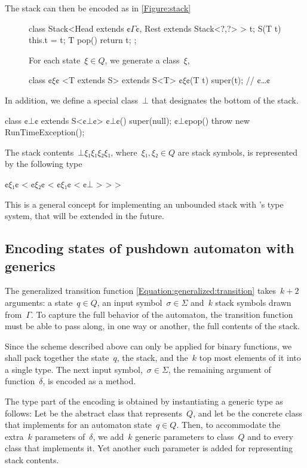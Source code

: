 The stack can then be encoded as in \cref{Figure:stack}
\begin{figure}
\begin{JAVA}
class Stack<Head extends ¢$Γ$¢, Rest extends Stack<?,?> > {
   t;
  S(T t) { this.t = t; }
  T pop() { return t; };
}
\end{JAVA}
For each state~$ξ∈Q$, we generate a \Java class~$ξ$,
\begin{JAVA}
class ¢$ξ$¢ <T extends S> extends S<T> {
  ¢$ξ$¢(T t) { super(t); }
  // ¢…¢
}
\end{JAVA}
\end{figure}
In addition, we define a special class~$⊥$ that designates the bottom of the stack.
\begin{JAVA}
class ¢$⊥$¢ extends S<¢$⊥$¢> {
  ¢$⊥$¢() { super(null); }
  ¢$⊥$¢pop() { throw new RunTimeException(); }
}
\end{JAVA}
The stack contents~$⊥ξ₁ξ₁ξ₂ξ₁$,
where~$ξ₁,ξ₂∈Q$ are stack symbols,
is represented by the following type
\begin{JAVA}
  ¢$ξ₁$¢ < ¢$ξ₂$¢ < ¢$ξ₁$¢ < ¢$⊥$ > > >
\end{JAVA}
This is a general concept for implementing an unbounded stack with \Java's type system,
that will be extended in the future.

\subsection{Encoding states of pushdown automaton with \Java generics}
The generalized transition function \cref{Equation:generalized:transition}
  takes~$k+2$ arguments: a state~$q∈Q$, an input symbol~$σ∈Σ$
    and~$k$ stack symbols drawn from~$Γ$.
To capture the full behavior of the automaton, the transition function
  must be able to pass along, in one way or another, the full contents of the stack.

Since the scheme described above can only be applied for binary functions,
  we shall pack together the state~$q$, the stack, and the~$k$ top most
  elements of it into a single type.
The next input symbol,~$σ∈Σ$, the remaining argument of function~$δ$,
  is encoded as a method.

The type part of the encoding is obtained by instantiating a generic type as follows:
Let  be the abstract class that represents~$Q$, and let  be the concrete class that
  implements  for an automaton state~$q∈Q$.
Then, to accommodate the extra~$k$ parameters of~$δ$, we add~$k$ generic parameters
  to class~$Q$ and to every class  that implements it.
Yet another such parameter is added for representing stack contents.

